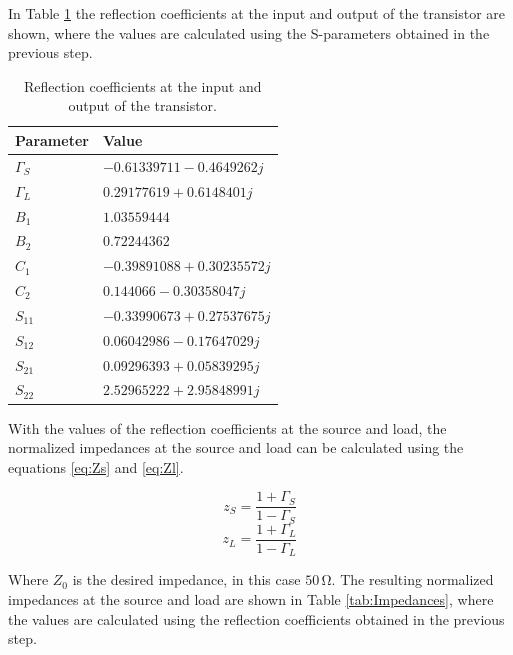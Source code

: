 In Table \ref{tab:ReflectionCoefficients} the reflection coefficients at the input and output of the transistor are shown, where the values are calculated using the S-parameters obtained in the previous step.
\begin{table}[H]
    \centering
    \caption{Reflection coefficients at the input and output of the transistor.}
    \begin{tabularx}{\textwidth}{>{\centering\arraybackslash}X >{\centering\arraybackslash}X}
        \toprule
        \textbf{Parameter} & \textbf{Value} \\
        \midrule
        $\Gamma_{S}$     & $-0.61339711-0.4649262j$ \\
        \midrule
        $\Gamma_{L}$     & $0.29177619+0.6148401j$\\
        \midrule
        $B_{1}$     & $1.03559444$\\
        \midrule
        $B_{2}$     & $0.72244362$\\
        \midrule
        $C_{1}$     & $-0.39891088+0.30235572j$\\
        \midrule
        $C_{2}$     & $0.144066-0.30358047j$\\
        \midrule
        $S_{11}$     & $-0.33990673+0.27537675j$\\
        \midrule
        $S_{12}$     & $0.06042986-0.17647029j$\\
        \midrule
        $S_{21}$     & $0.09296393+0.05839295j$\\
        \midrule
        $S_{22}$     & $2.52965222+2.95848991j$\\
        \bottomrule
    \end{tabularx}
    \label{tab:ReflectionCoefficients}
\end{table}

With the values of the reflection coefficients at the source and load, the normalized impedances at the source and load can be calculated using the equations \ref{eq:Zs} and \ref{eq:Zl}.

\begin{equation}
    z_{S} = \frac{1+\Gamma_{S}}{1-\Gamma_{S}}
    \label{eq:Zs}
\end{equation}
\begin{equation}
    z_{L} = \frac{1+\Gamma_{L}}{1-\Gamma_{L}}
    \label{eq:Zl}
\end{equation}

Where $Z_0$ is the desired impedance, in this case $50\,\si{\ohm}$.
The resulting normalized impedances at the source and load are shown in Table \ref{tab:Impedances}, where the values are calculated using the reflection coefficients obtained in the previous step.


